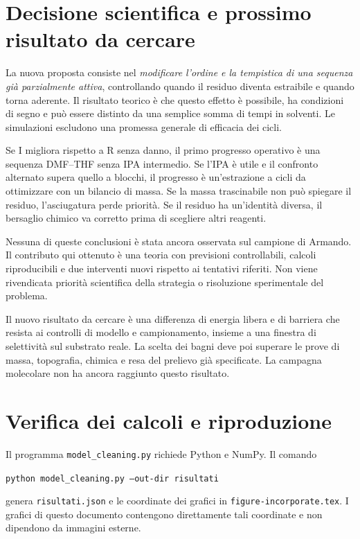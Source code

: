 \documentclass[11pt,reqno]{amsart}
\numberwithin{equation}{section}
\begin{document}
\section{Decisione scientifica e prossimo risultato da cercare}

La nuova proposta consiste nel \emph{modificare l'ordine e la
tempistica di una sequenza gi\`a parzialmente attiva}, controllando
quando il residuo diventa estraibile e quando torna aderente.
Il risultato teorico \`e che questo effetto \`e possibile, ha
condizioni di segno e pu\`o essere distinto da una semplice
somma di tempi in solventi. Le simulazioni escludono una
promessa generale di efficacia dei cicli.

Se I migliora rispetto a R senza danno, il primo progresso
operativo \`e una sequenza DMF--THF senza IPA intermedio.
Se l'IPA \`e utile e il confronto alternato supera quello
a blocchi, il progresso \`e un'estrazione a cicli da ottimizzare
con un bilancio di massa. Se la massa trascinabile non pu\`o
spiegare il residuo, l'asciugatura perde priorit\`a. Se il
residuo ha un'identit\`a diversa, il bersaglio chimico va
corretto prima di scegliere altri reagenti.

Nessuna di queste conclusioni \`e stata ancora osservata sul
campione di Armando. Il contributo qui ottenuto \`e una teoria
con previsioni controllabili, calcoli riproducibili e due
interventi nuovi rispetto ai tentativi riferiti. Non viene
rivendicata priorit\`a scientifica della strategia o risoluzione
sperimentale del problema.

Il nuovo risultato da cercare \`e una differenza di energia libera
e di barriera che resista ai controlli di modello e campionamento,
insieme a una finestra di selettivit\`a sul substrato reale. La scelta
dei bagni deve poi superare le prove di massa, topografia, chimica
e resa del prelievo gi\`a specificate. La campagna molecolare non
ha ancora raggiunto questo risultato.

\appendix
\section{Verifica dei calcoli e riproduzione}

Il programma \texttt{model\_cleaning.py} richiede Python e NumPy.
Il comando
\begin{center}
\texttt{python model\_cleaning.py --out-dir risultati}
\end{center}
genera \texttt{risultati.json} e le coordinate dei grafici
in \texttt{figure-incorporate.tex}. I grafici di questo
documento contengono direttamente tali coordinate e non
dipendono da immagini esterne.
\end{document}
